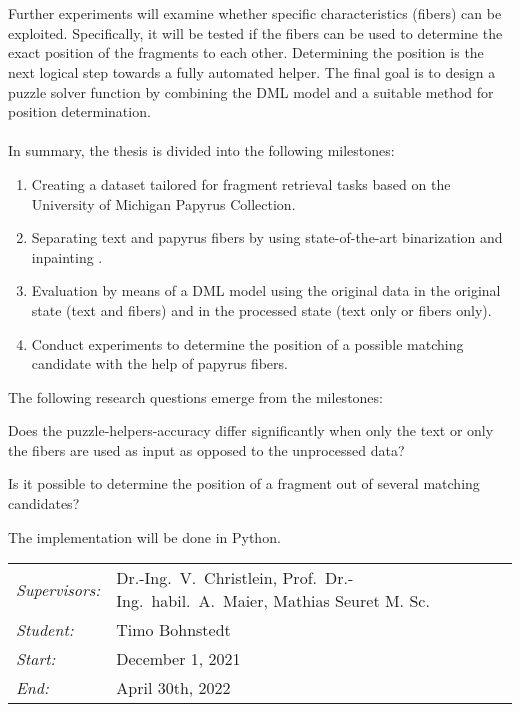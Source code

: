 \documentclass[12pt,a4paper]{article}
\begin{document}
\\\\
Further experiments will examine whether specific characteristics (fibers) can be exploited. Specifically, it will be tested if the fibers can be used to determine the exact position of the fragments to each other. Determining the position is the next logical step towards a fully automated helper. The final goal is to design a puzzle solver function by combining the DML model and a suitable method for position determination. 
\\\\
In summary, the thesis is divided into the following milestones:

\begin{enumerate}[label=\bf{\Roman*.}]
	\item Creating a dataset tailored for fragment retrieval tasks based on the University of Michigan Papyrus Collection. 
	\item Separating text and papyrus fibers by using state-of-the-art binarization \cite{Tensmeyer20} and inpainting \cite{Liu18Impainting}.
	
	\item Evaluation by means of a DML model using the original data in the original state (text and fibers) and in the processed state (text only or fibers only).
	
	\item Conduct experiments to determine the position of a possible matching candidate  with the help of papyrus fibers.
\end{enumerate}

The following research questions emerge from the milestones:

\begin{questions}
	\item  Does the puzzle-helpers-accuracy differ significantly when only the text or only the fibers are used as input as opposed to the unprocessed data?  
	
	\item  Is it possible to determine the position of a fragment out of several matching candidates?
	
\end{questions}

		
The implementation will be done in Python.\\
		
\begin{tabular}{ll}
	\emph{Supervisors:} & Dr.-Ing.~V.~Christlein,  Prof.~Dr.-Ing.~habil.~A.~Maier, Mathias Seuret M. Sc.
	\\
	\emph{Student:}     & Timo Bohnstedt
	\\
	\emph{Start:}       & December 1, 2021                                            \\
	\emph{End:}         & April 30th, 2022                                        \\
\end{tabular}
\nopagebreak[4]
\small


		
\end{document}
